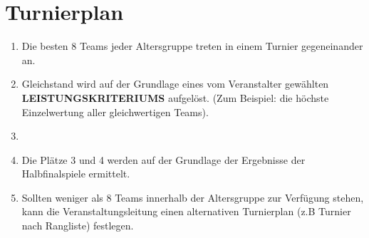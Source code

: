 \documentclass[a4paper,12pt]{article}
\begin{document}
\section{Turnierplan}
\begin{enumerate}
	\item Die besten 8 Teams jeder Altersgruppe treten in einem Turnier
		gegeneinander an.
	\item Gleichstand wird auf der Grundlage eines vom Veranstalter
		gewählten \textbf{LEISTUNGSKRITERIUMS} aufgelöst. (Zum Beispiel:
		die höchste Einzelwertung aller gleichwertigen Teams).
        \item \tournamentQualification
	\item Die Plätze 3 und 4 werden auf der Grundlage der Ergebnisse der
		Halbfinalspiele ermittelt.
	\item Sollten weniger als 8 Teams innerhalb der Altersgruppe zur Verfügung stehen, kann die Veranstaltungsleitung einen alternativen Turnierplan (z.B Turnier nach Rangliste) festlegen.
\end{enumerate}
\tournamentScoring
\combinedTournament
\end{document}
